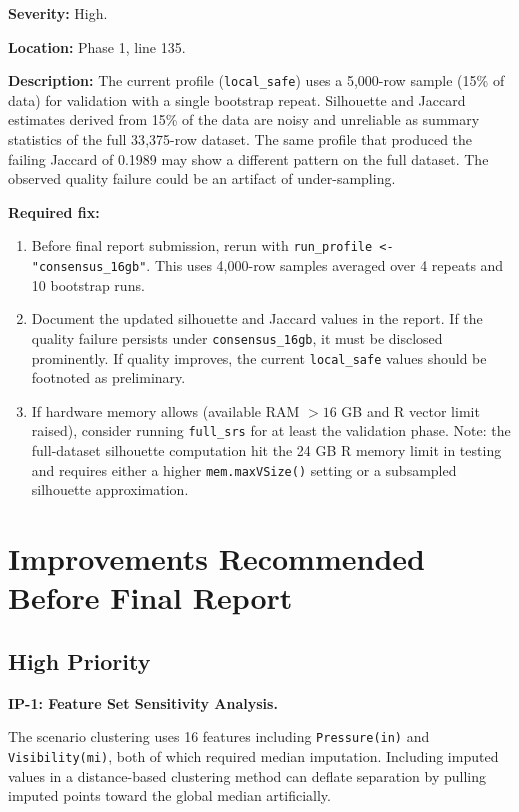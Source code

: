 \documentclass[11pt]{article}
\begin{document}
\textbf{Severity:} High.

\textbf{Location:} Phase 1, line 135.

\textbf{Description:} The current profile (\texttt{local\_safe}) uses a 5{,}000-row
sample (15\% of data) for validation with a single bootstrap repeat. Silhouette
and Jaccard estimates derived from 15\% of the data are noisy and unreliable as
summary statistics of the full 33{,}375-row dataset. The same profile that
produced the failing Jaccard of 0.1989 may show a different pattern on the full
dataset. The observed quality failure could be an artifact of under-sampling.

\textbf{Required fix:}
\begin{enumerate}
\item Before final report submission, rerun with \texttt{run\_profile <- "consensus\_16gb"}.
  This uses 4{,}000-row samples averaged over 4 repeats and 10 bootstrap runs.
\item Document the updated silhouette and Jaccard values in the report. If the
  quality failure persists under \texttt{consensus\_16gb}, it must be disclosed
  prominently. If quality improves, the current \texttt{local\_safe} values should
  be footnoted as preliminary.
\item If hardware memory allows (available RAM $> 16$ GB and R vector limit
  raised), consider running \texttt{full\_srs} for at least the validation phase.
  Note: the full-dataset silhouette computation hit the 24 GB R memory limit
  in testing and requires either a higher \texttt{mem.maxVSize()} setting or
  a subsampled silhouette approximation.
\end{enumerate}

\section{Improvements Recommended Before Final Report}

\subsection{High Priority}

\textbf{IP-1: Feature Set Sensitivity Analysis.}

The scenario clustering uses 16 features including \texttt{Pressure(in)} and
\texttt{Visibility(mi)}, both of which required median imputation. Including
imputed values in a distance-based clustering method can deflate separation
by pulling imputed points toward the global median artificially.
\end{document}
